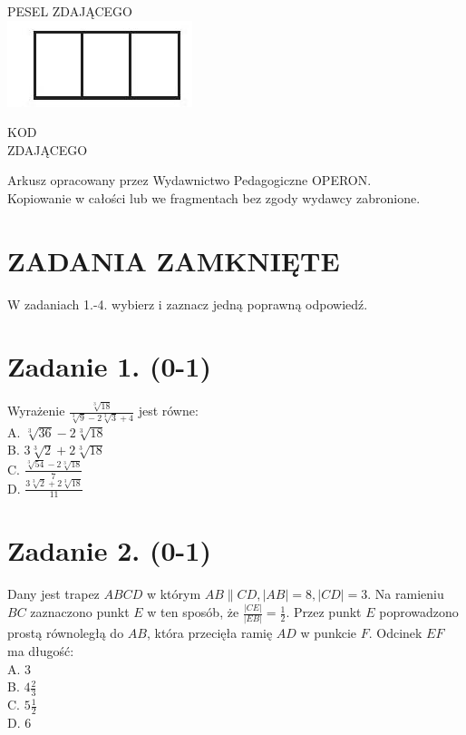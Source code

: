 \documentclass[10pt]{article}
\begin{document}
PESEL ZDAJĄCEGO\\
\includegraphics[max width=\textwidth, center]{2024_11_21_599d917d55a506aace4bg-01}

KOD\\
ZDAJĄCEGO

Arkusz opracowany przez Wydawnictwo Pedagogiczne OPERON.\\
Kopiowanie w całości lub we fragmentach bez zgody wydawcy zabronione.

\section*{ZADANIA ZAMKNIĘTE}
W zadaniach 1.-4. wybierz i zaznacz jedną poprawną odpowiedź.

\section*{Zadanie 1. (0-1)}
Wyrażenie \(\frac{\sqrt[3]{18}}{\sqrt[3]{9}-2 \sqrt[3]{3}+4}\) jest równe:\\
A. \(\sqrt[3]{36}-2 \sqrt[3]{18}\)\\
B. \(3 \sqrt[3]{2}+2 \sqrt[3]{18}\)\\
C. \(\frac{\sqrt[3]{54}-2 \sqrt[3]{18}}{7}\)\\
D. \(\frac{3 \sqrt[3]{2}+2 \sqrt[3]{18}}{11}\)

\section*{Zadanie 2. (0-1)}
Dany jest trapez \(A B C D\) w którym \(A B \| C D,|A B|=8,|C D|=3\). Na ramieniu \(B C\) zaznaczono punkt \(E\) w ten sposób, że \(\frac{|C E|}{|E B|}=\frac{1}{2}\). Przez punkt \(E\) poprowadzono prostą równoległą do \(A B\), która przecięła ramię \(A D\) w punkcie \(F\). Odcinek \(E F\) ma długość:\\
A. 3\\
B. \(4 \frac{2}{3}\)\\
C. \(5 \frac{1}{2}\)\\
D. 6
\end{document}
